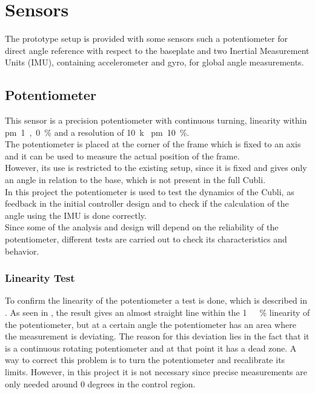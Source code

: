 \section{Sensors}
\label{sec:Sensors}
The prototype setup is provided with some sensors such a potentiometer for direct angle reference with respect to the baseplate and two Inertial Measurement Units (IMU), containing accelerometer and gyro, for global angle measurements.

\subsection{Potentiometer}
This sensor is a precision potentiometer with continuous turning, linearity within \si{\pm1,0\%} and a resolution of \SI{10}{k\Omega} \si{\pm10\%}.\\
The potentiometer is placed at the corner of the frame which is fixed to an axis and it can be used to measure the actual position of the frame.\\
However, its use is restricted to the existing setup, since it is fixed and gives only an angle in relation to the base, which is not present in the full Cubli.\\
In this project the potentiometer is used to test the dynamics of the Cubli, as feedback in the initial controller design and to check if the calculation of the angle using the IMU is done correctly.\\
Since some of the analysis and design will depend on the reliability of the potentiometer, different tests are carried out to check its characteristics and behavior.
%
\subsubsection{Linearity Test}
To confirm the linearity of the potentiometer a test is done, which is described in . As seen in , the result gives an almost straight line within the \si{1\ \%} linearity of the potentiometer, but at a certain angle the potentiometer has an area where the measurement is deviating. The reason for this deviation lies in the fact that it is a continuous rotating potentiometer and at that point it has a dead zone. A way to correct this problem is to turn the potentiometer and recalibrate its limits. However, in this project it is not necessary since precise measurements are only needed around 0 degrees in the control region.


